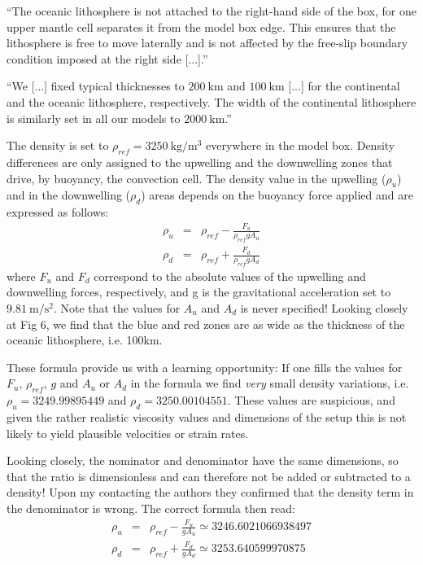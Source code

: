 ``The oceanic lithosphere is not attached
to the right-hand side of the box, for one upper mantle cell
separates it from the model box edge. This ensures that the
lithosphere is free to move laterally and is not affected by
the free-slip boundary condition imposed at the right side [...].''

``We [...] fixed typical thicknesses to
$200~\si{\km}$ and $100~\si{\km}$ [...] for the continental and the oceanic lithosphere, 
respectively. The width of the continental lithosphere is similarly
set in all our models to $2000~\si{\km}$.''

The density is set to $\rho_{ref}=3250~\si{\kg\per\cubic\meter}$ everywhere in the model box. Density
differences are only assigned to the upwelling and the
downwelling zones that drive, by buoyancy, the convection
cell. The density value in the upwelling ($\rho_u$) and
in the downwelling ($\rho_d$) areas depends on the buoyancy force
applied and are expressed as follows:
\begin{eqnarray}
\rho_u &=& \rho_{ref} - \frac{F_u}{\rho_{ref} g A_u} \\
\rho_d &=& \rho_{ref} + \frac{F_d}{\rho_{ref} g A_d} 
\end{eqnarray}
where $F_u$ and $F_d$ correspond to the absolute values of the 
upwelling and downwelling forces, respectively, and g is the gravitational 
acceleration set to $9.81~\si{\meter\per\square\second}$.
Note that the values for $A_u$ and $A_d$ is never specified!
Looking closely at Fig 6, we find that the blue and red zones are as wide as 
the thickness of the oceanic lithosphere, i.e. 100km.

These formula provide us with a learning opportunity:
If one fills the values for $F_u$, $\rho_{ref}$, $g$ and $A_u$ or $A_d$
in the formula we find {\it very} small density variations, i.e.
$\rho_u=3249.99895449$ and $\rho_d=3250.00104551$. 
These values are suspicious, and given the rather realistic viscosity
values and dimensions of the setup this is not likely to yield 
plausible velocities or strain rates. 

Looking closely, the nominator and denominator have the same dimensions, 
so that the ratio is dimensionless and can therefore not be 
added or subtracted to a density! Upon my contacting the authors they confirmed
that the density term in the denominator is wrong.
The correct formula then read:
\begin{eqnarray}
\rho_u &=& \rho_{ref} - \frac{F_u}{ g A_u} \simeq 3246.6021066938497\\
\rho_d &=& \rho_{ref} + \frac{F_d}{ g A_d} \simeq 3253.640599970875
\end{eqnarray}

